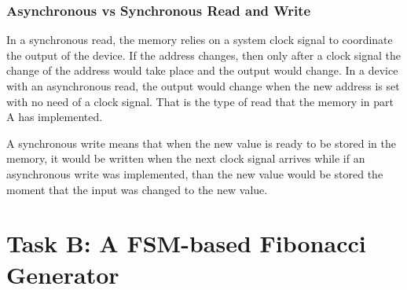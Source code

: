 \documentclass[10pt]{article}
\begin{document}
\subsubsection{Asynchronous vs Synchronous Read and Write}
In a synchronous read, the memory relies on a system clock signal to coordinate the output of the device. If the address changes, then only after a clock signal the change of the address would take place and the output would change.
In a device with an asynchronous read, the output would change when the new address is set with no need of a clock signal. That is the type of read that the memory in part A has implemented.

A synchronous write means that when the new value is ready to be stored in the memory, it would be written when the next clock signal arrives while if an asynchronous write was implemented, than the new value would be stored the moment that the input was changed to the new value.

\newpage


\section{Task B: A FSM-based Fibonacci Generator}
\end{document}
